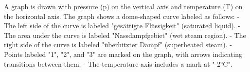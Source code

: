 A graph is drawn with pressure (p) on the vertical axis and temperature (T) on the horizontal axis. The graph shows a dome-shaped curve labeled as follows:  
- The left side of the curve is labeled "gesättigte Flüssigkeit" (saturated liquid).  
- The area under the curve is labeled "Nassdampfgebiet" (wet steam region).  
- The right side of the curve is labeled "überhitzter Dampf" (superheated steam).  
- Points labeled "1", "2", and "3" are marked on the graph, with arrows indicating transitions between them.  
- The temperature axis includes a mark at "-2°C".
